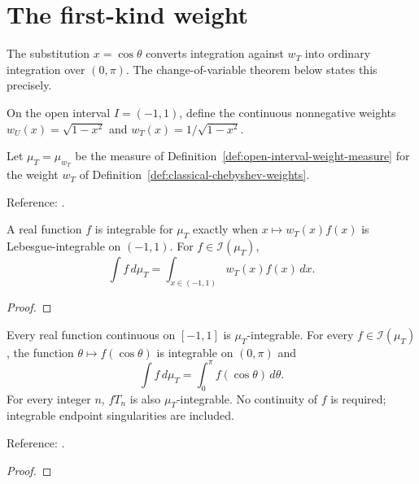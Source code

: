 \section{The first-kind weight}\label{sec:textbook-weights-first-kind}

The substitution $x=\cos\theta$ converts integration against $w_T$ into ordinary integration over $(0,\pi)$. The change-of-variable theorem below states this precisely.

\begin{definition}
\label{def:classical-chebyshev-weights}
\leanok
On the open interval $I=(-1,1)$, define the continuous nonnegative weights $w_U(x)=\sqrt{1-x^2}$ and $w_T(x)=1/\sqrt{1-x^2}$.
\end{definition}

\begin{definition}
\label{def:measureT}
\leanok
Let $\mu_T=\mu_{w_T}$ be the measure of Definition~\ref{def:open-interval-weight-measure}
for the weight $w_T$ of Definition~\ref{def:classical-chebyshev-weights}.

Reference: \cite[Table 18.3.1]{dlmf}.
\end{definition}

\begin{theorem}
\label{thm:measureT-integrability}
\leanok
A real function $f$ is integrable for $\mu_T$ exactly when $x\mapsto w_T(x)f(x)$ is Lebesgue-integrable on $(-1,1)$. For $f\in\mathcal I(\mu_T)$,
\[\int f\,d\mu_T=\int_{x\in(-1,1)}w_T(x)f(x)\,dx.\]
\end{theorem}
\begin{proof}
\leanok
\end{proof}

\begin{theorem}
\label{thm:T-integrable-transport}
\leanok
Every real function continuous on $[-1,1]$ is $\mu_T$-integrable.
For every $f\in\mathcal I(\mu_T)$, the function $\theta\mapsto f(\cos\theta)$
is integrable on $(0,\pi)$ and
\[\int f\,d\mu_T=\int_0^\pi f(\cos\theta)\,d\theta.\]
For every integer $n$, $fT_n$ is also $\mu_T$-integrable. No continuity of $f$
is required; integrable endpoint singularities are included.

Reference: \cite[Chapter 3]{atap}.
\end{theorem}
\begin{proof}
\leanok
\end{proof}

